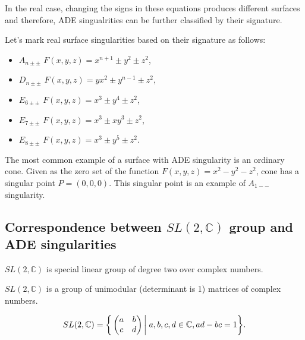 In the real case, changing the signs in these equations produces different
surfaces and therefore, ADE singualrities can be further classified by their
signature.

\begin{definition}
    Let's mark real surface singularities based on their signature as follows:
    \begin{itemize}
        \item $A_{n\pm\pm}$ \hspace{5mm} $F(x,y,z)=x^{n+1}\pm y^2\pm z^2$,
              
        \item $D_{n\pm\pm}$ \hspace{5mm} $F(x,y,z)=yx^2\pm y^{n-1}\pm z^2$,
        
        \item $E_{6\pm\pm}$ \hspace{5mm} $F(x,y,z)=x^3\pm y^4\pm z^2$,
        
        \item $E_{7\pm\pm}$ \hspace{5mm} $F(x,y,z)=x^3\pm xy^3\pm z^2$,
        
        \item $E_{8\pm\pm}$ \hspace{5mm} $F(x,y,z)=x^3\pm y^5\pm z^2$.
        \end{itemize}
\end{definition}

The most common example of a surface with ADE singularity is an ordinary cone.
Given as the zero set of the function $F(x, y, z)=x^2-y^2-z^2$, cone has
a singular point $P=(0, 0, 0)$. This singular point is an example of $A_{1--}$
singularity.

\subsection*{Correspondence between $SL(2,\mathbb{C})$ group and ADE singularities}
\label{subs2.2.2}
$SL(2, \mathbb{C})$ is special linear group of degree two over complex numbers.
\begin{definition}
    $SL(2, \mathbb{C})$ is a group of unimodular (determinant is 1) matrices
    of complex numbers.

    $$SL(2, \mathbb{C}) = \bigg\{
        \begin{pmatrix}
            a & b\\ 
            c & d
          \end{pmatrix} \bigg| \hspace{1mm} a,b,c,d \in \mathbb{C}, ad-bc=1
          \bigg\}.$$
\end{definition}

